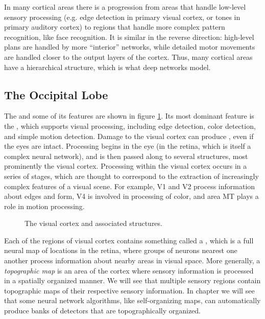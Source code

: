 In many cortical areas there is a progression from areas that handle low-level sensory processing (e.g. edge detection in primary visual cortex, or tones in primary auditory cortex) to regions that handle more complex pattern recognition, like face recognition. It is similar in the reverse direction: high-level plans are handled by more ``interior'' networks, while detailed motor movements are handled closer to the output layers of the cortex. Thus, many cortical areas have a hierarchical structure, which is what deep networks model.

\subsection{The Occipital Lobe}\label{occipitalLobe}

The  and some of its features are shown in figure \ref{brain_vision}. Its most dominant feature is the , which supports visual processing, including edge detection, color detection, and simple motion detection. Damage to the visual cortex can produce , even if the eyes are intact. Processing begins in the eye (in the retina, which is itself a complex neural network), and is then passed along to several structures, most prominently the visual cortex. Processing within the visual cortex occurs in a series of stages, which are thought to correspond to the extraction of increasingly complex features of a visual scene. For example, V1 and V2  process information about edges and form, V4 is involved in processing of color, and area MT plays a role in motion processing. 

\begin{figure}[h]
\centering
{}
\caption[Pamela Payne.]{The visual cortex and associated structures.}
\label{brain_vision}
\end{figure}

Each of the regions of visual cortex contains something called a , which is a full neural map of locations in the retina, where groups of neurons nearest one another process information about nearby areas in visual space. More generally, a \emph{topographic map} is an area of the cortex where sensory information is processed in a spatially organized manner. We will see that multiple sensory regions contain topographic maps of their respective sensory information. In chapter  we will see that some neural network algorithms, like self-organizing maps, can automatically produce banks of detectors that are topographically organized.

